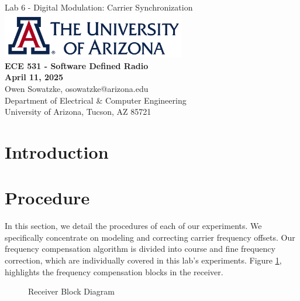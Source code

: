 \documentclass{article}
\begin{document}
\begin{titlepage}
	\centering
	{\huge Lab 6 - Digital Modulation: Carrier Synchronization}\\[0.25 in]
	\includegraphics[width=0.6\textwidth]{ua_logo.png}\\[0.25 in]
	{\large \textbf{ECE 531 - Software Defined Radio\\[0.25 in]
	April 11, 2025\\[0.25 in]}}
	{\large Owen Sowatzke, osowatzke@arizona.edu\\[0.05 in]
	Department of Electrical \& Computer Engineering\\[0.05 in]
	University of Arizona, Tucson, AZ 85721\\[0.5 in]}
	\hypersetup{linkcolor=navy-blue}
	\noindent\hrulefill
	\tableofcontents
	\noindent\hrulefill
\end{titlepage}


\section{Introduction}

\section{Procedure}

In this section, we detail the procedures of each of our experiments. We specifically concentrate on modeling and correcting carrier frequency offsets. Our frequency compensation algorithm is divided into course and fine frequency correction, which are individually covered in this lab's experiments. Figure \ref{fig::receiver_block_diagram}, highlights the frequency compensation blocks in the receiver.

\begin{figure}[H]
	\centerline{}
	\caption{Receiver Block Diagram}
	\label{fig::receiver_block_diagram}
\end{figure}
\end{document}
